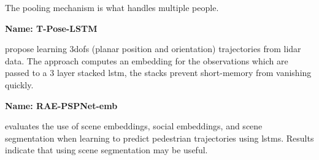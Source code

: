 The pooling mechanism is what handles multiple people.



\textbf{Name: T-Pose-LSTM}

\cite{sun20183dof} propose learning 3\glspl{dof} (planar position and orientation) trajectories from lidar data.
%
The approach computes an embedding for the observations which are passed to a 3 layer stacked \gls{lstm}, the stacks prevent short-memory from vanishing quickly.




\textbf{Name: RAE-PSPNet-emb}

\cite{syed2020cnn} evaluates the use of scene embeddings, social embeddings, and scene segmentation when learning to predict pedestrian trajectories using \glspl{lstm}.
%
Results indicate that using scene segmentation may be useful.
%
